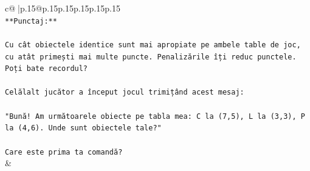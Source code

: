 \documentclass{article}
\begin{document}
{\begin{supertabular}{c@{$\;$}|p{.15\linewidth}@{}p{.15\linewidth}p{.15\linewidth}p{.15\linewidth}p{.15\linewidth}p{.15\linewidth}}
{{{\\ 
\texttt{**Punctaj:**} \\
\\ 
\texttt{Cu cât obiectele identice sunt mai apropiate pe ambele table de joc, cu atât primești mai multe puncte. Penalizările îți reduc punctele. Poți bate recordul?} \\
\\ 
\texttt{Celălalt jucător a început jocul trimițând acest mesaj:} \\
\\ 
\texttt{"Bună! Am următoarele obiecte pe tabla mea: C la (7,5), L la (3,3), P la (4,6). Unde sunt obiectele tale?"} \\
\\ 
\texttt{Care este prima ta comandă?} \\
            }
        }
    }
    & \\ \\


\end{supertabular}}
\end{document}

